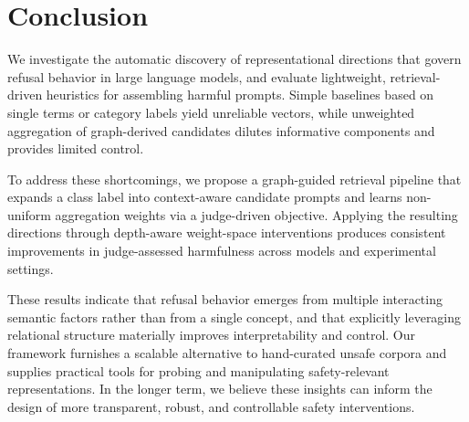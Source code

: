 \documentclass{article}
\theoremstyle{plain}
\theoremstyle{definition}
\theoremstyle{remark}
\begin{document}
\section{Conclusion}
We investigate the automatic discovery of representational directions that govern refusal behavior in large language models, and evaluate lightweight, retrieval-driven heuristics for assembling harmful prompts. Simple baselines based on single terms or category labels yield unreliable vectors, while unweighted aggregation of graph-derived candidates dilutes informative components and provides limited control.

To address these shortcomings, we propose a graph-guided retrieval pipeline that expands a class label into context-aware candidate prompts and learns non-uniform aggregation weights via a judge-driven objective. Applying the resulting directions through depth-aware weight-space interventions produces consistent improvements in judge-assessed harmfulness across models and experimental settings.

These results indicate that refusal behavior emerges from multiple interacting semantic factors rather than from a single concept, and that explicitly leveraging relational structure materially improves interpretability and control. Our framework furnishes a scalable alternative to hand-curated unsafe corpora and supplies practical tools for probing and manipulating safety-relevant representations. In the longer term, we believe these insights can inform the design of more transparent, robust, and controllable safety interventions.



\end{document}
